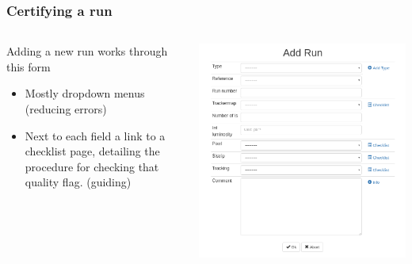 \documentclass{beamer}
\begin{document}
\begin{frame}
  \frametitle{Certifying a run}
  \begin{columns}[T]
    \begin{column}{.5\textwidth}
    \begin{block}{}

	Adding a new run works through this form
	\begin{itemize}
	\item Mostly dropdown menus (reducing errors)
	\item Next to each field a link to a checklist page, detailing the procedure for checking that quality flag. (guiding)
	\end{itemize}
   	\end{block}	
    \end{column}
    \begin{column}{.5\textwidth}
    \begin{block}{}
	\includegraphics[width=\textwidth]{figures/add_run.png}
    \end{block}
  \end{column}
\end{columns}
\end{frame}
\end{document}

